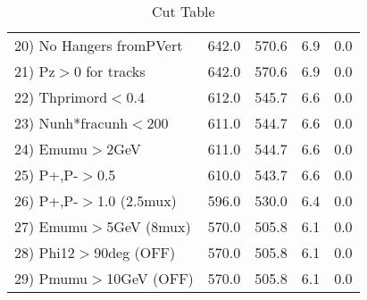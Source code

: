 \begin{table}[h!]
\begin{tabular}{||l||r|r|r|r||}
 20) No Hangers fromPVert &       642.0 &       570.6 &         6.9 &         0.0 \\
 21) Pz$>$0 for tracks    &       642.0 &       570.6 &         6.9 &         0.0 \\
 22) Thprimord$<$0.4      &       612.0 &       545.7 &         6.6 &         0.0 \\
 23) Nunh*fracunh$<$200   &       611.0 &       544.7 &         6.6 &         0.0 \\
 24) Emumu$>$2GeV         &       611.0 &       544.7 &         6.6 &         0.0 \\
 25) P+,P-$>$0.5          &       610.0 &       543.7 &         6.6 &         0.0 \\
 26) P+,P-$>$1.0 (2.5mux) &       596.0 &       530.0 &         6.4 &         0.0 \\
 27) Emumu$>$5GeV  (8mux) &       570.0 &       505.8 &         6.1 &         0.0 \\
 28) Phi12$>$90deg  (OFF) &       570.0 &       505.8 &         6.1 &         0.0 \\
 29) Pmumu$>$10GeV  (OFF) &       570.0 &       505.8 &         6.1 &         0.0 \\
 \hline
 \hline
 \end{tabular}
 \caption{Cut Table \cohpip }
 \label{tab-cut_copip}
 \end{table}
